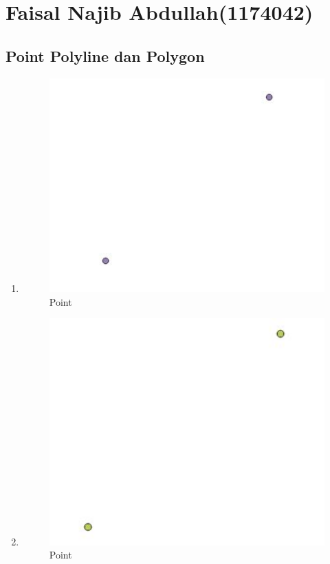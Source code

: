 \section{Faisal Najib Abdullah(1174042)}
\subsection{Point Polyline dan Polygon}
\begin{enumerate}
	\item 
	
	\begin{figure}[H]
		\includegraphics[width=12cm]{figures/1174042/No1.JPG}
		\centering
		\caption{Point}
	\end{figure}
	
	\item 
	
	\begin{figure}[H]
		\includegraphics[width=12cm]{figures/1174042/No2.JPG}
		\centering
		\caption{Point}
	\end{figure}
	

\end{enumerate}
